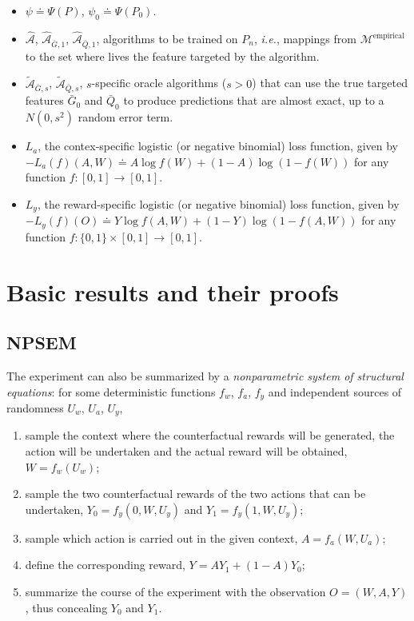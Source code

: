 \documentclass[
  11pt,
  openright,twoside]{book}
\newcommand{\Algo}{\widehat{\mathcal{A}}}
\newcommand{\Algora}{\widetilde{\mathcal{A}}}
\newcommand{\defq}{\doteq}
\newcommand{\calM}{\mathcal{M}}
\newcommand{\Gbar}{\bar{G}}
\newcommand{\Qbar}{\bar{Q}}
\theoremstyle{definition}
\theoremstyle{definition}
\theoremstyle{definition}
\theoremstyle{definition}
\theoremstyle{remark}
\begin{document}
\begin{itemize}
\item
  \(\psi \defq \Psi(P)\), \(\psi_{0} \defq \Psi(P_{0})\).
\item
  \(\Algo\), \(\Algo_{\Gbar,1}\), \(\Algo_{\Qbar,1}\), algorithms to be trained on
  \(P_{n}\), \emph{i.e.}, mappings from \(\calM^{\text{empirical}}\) to the set where
  lives the feature targeted by the algorithm.
\item
  \(\Algora_{\Gbar,s}\), \(\Algora_{\Qbar,s}\), \(s\)-specific oracle algorithms
  (\(s>0\)) that can use the true targeted features \(\Gbar_{0}\) and \(\Qbar_{0}\)
  to produce predictions that are almost exact, up to a \(N(0,s^{2})\) random
  error term.
\item
  \(L_{a}\), the contex-specific logistic (or negative binomial) loss function,
  given by \(-L_{a}(f)(A,W) \defq A \log f(W) + (1-A) \log (1-f(W))\) for
  any function \(f:[0,1]\to[0,1]\).
\item
  \(L_{y}\), the reward-specific logistic (or negative binomial) loss function,
  given by \(-L_{y}(f)(O) \defq Y \log f(A,W) + (1-Y) \log (1-f(A,W))\) for
  any function \(f:\{0,1\} \times [0,1] \to[0,1]\).
\end{itemize}

\hypertarget{proofs}{%
\chapter{Basic results and their proofs}\label{proofs}}

\hypertarget{npsem}{%
\section{NPSEM}\label{npsem}}

The experiment can also be summarized by a \emph{nonparametric system of structural
equations}: for some deterministic functions \(f_w\), \(f_a\), \(f_y\) and
independent sources of randomness \(U_w\), \(U_a\), \(U_y\),

\begin{enumerate}
\def\labelenumi{\arabic{enumi}.}
\item
  sample the context where the counterfactual rewards will be generated, the
  action will be undertaken and the actual reward will be obtained, \(W = f_{w}(U_w)\);
\item
  sample the two counterfactual rewards of the two actions that can be
  undertaken, \(Y_{0} = f_{y}(0, W, U_y)\) and \(Y_{1} = f_{y}(1, W, U_y)\);
\item
  sample which action is carried out in the given context, \(A = f_{a} (W, U_a)\);
\item
  define the corresponding reward, \(Y = A Y_{1} + (1-A) Y_{0}\);
\item
  summarize the course of the experiment with the observation \(O = (W, A, Y)\), thus concealing \(Y_{0}\) and \(Y_{1}\).
\end{enumerate}
\end{document}
